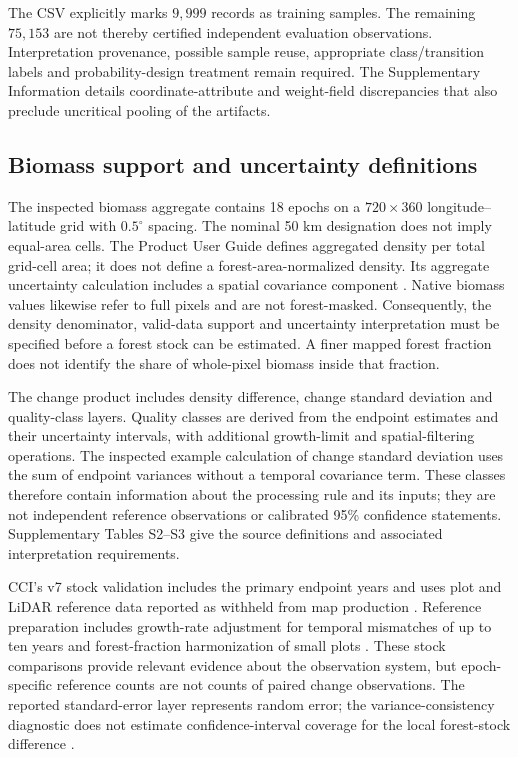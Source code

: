 \documentclass[11pt,a4paper]{article}
\begin{document}
The CSV explicitly marks $9{,}999$ records as training samples. The remaining $75{,}153$ are not thereby certified independent evaluation observations. Interpretation provenance, possible sample reuse, appropriate class/transition labels and probability-design treatment remain required. The Supplementary Information details coordinate-attribute and weight-field discrepancies that also preclude uncritical pooling of the artifacts.

\subsection{Biomass support and uncertainty definitions}
The inspected biomass aggregate contains 18 epochs on a $720\times360$ longitude--latitude grid with $0.5^\circ$ spacing. The nominal 50 km designation does not imply equal-area cells. The Product User Guide defines aggregated density per total grid-cell area; it does not define a forest-area-normalized density. Its aggregate uncertainty calculation includes a spatial covariance component \citep{PUG2026}. Native biomass values likewise refer to full pixels and are not forest-masked. Consequently, the density denominator, valid-data support and uncertainty interpretation must be specified before a forest stock can be estimated. A finer mapped forest fraction does not identify the share of whole-pixel biomass inside that fraction.

The change product includes density difference, change standard deviation and quality-class layers. Quality classes are derived from the endpoint estimates and their uncertainty intervals, with additional growth-limit and spatial-filtering operations. The inspected example calculation of change standard deviation uses the sum of endpoint variances without a temporal covariance term. These classes therefore contain information about the processing rule and its inputs; they are not independent reference observations or calibrated 95\% confidence statements. Supplementary Tables S2--S3 give the source definitions and associated interpretation requirements.

CCI's v7 stock validation includes the primary endpoint years and uses plot and LiDAR reference data reported as withheld from map production \citep[pp.~11--14, 64, 67]{PVIR2026}. Reference preparation includes growth-rate adjustment for temporal mismatches of up to ten years and forest-fraction harmonization of small plots \citep[p.~18]{PVIR2026}. These stock comparisons provide relevant evidence about the observation system, but epoch-specific reference counts are not counts of paired change observations. The reported standard-error layer represents random error; the variance-consistency diagnostic does not estimate confidence-interval coverage for the local forest-stock difference \citep[p.~19]{PVIR2026}.
\end{document}
